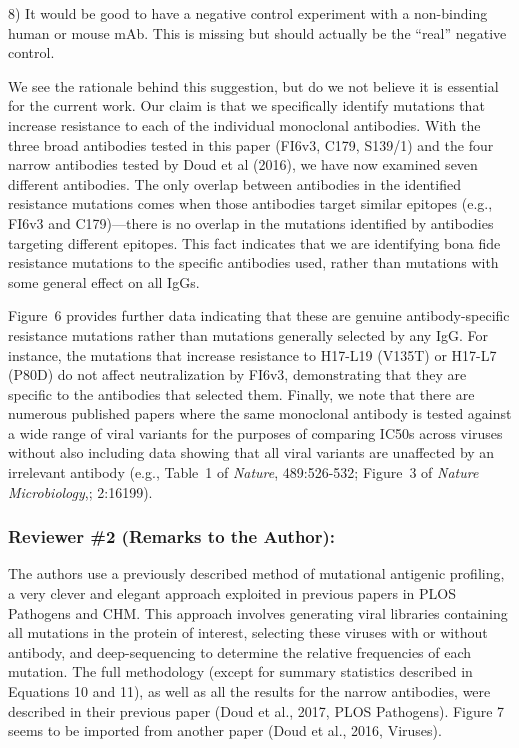 \documentclass[11pt, oneside]{article}   	%
\begin{document}
8) It would be good to have a negative control experiment with a non-binding human or mouse mAb. This is missing but should actually be the ``real'' negative control.

{\color{black}
We see the rationale behind this suggestion, but do we not believe it is essential for the current work. 
Our claim is that we specifically identify mutations that increase resistance to each of the individual monoclonal antibodies.
With the three broad antibodies tested in this paper (FI6v3, C179, S139/1) and the four narrow antibodies tested by Doud et al (2016), we have now examined seven different antibodies.
The only overlap between antibodies in the identified resistance mutations comes when those antibodies target similar epitopes (e.g., FI6v3 and C179)---there is no overlap in the mutations identified by antibodies targeting different epitopes.
This fact indicates that we are identifying bona fide resistance mutations to the specific antibodies used, rather than mutations with some general effect on all IgGs.

Figure~6 provides further data indicating that these are genuine antibody-specific resistance mutations rather than mutations generally selected by any IgG.
For instance, the mutations that increase resistance to H17-L19 (V135T) or H17-L7 (P80D) do not affect neutralization by FI6v3, demonstrating that they are specific to the antibodies that selected them.
Finally, we note that there are numerous published papers where the same monoclonal antibody is tested against a wide range of viral variants for the purposes of comparing IC50s across viruses without also including data showing that all viral variants are unaffected by an irrelevant antibody (e.g., Table~1 of \textit{Nature}, 489:526-532; Figure~3 of \textit{Nature Microbiology},; 2:16199).
}

\subsubsection*{Reviewer \#2 (Remarks to the Author):}

The authors use a previously described method of mutational antigenic profiling, a very clever and elegant approach exploited in previous papers in PLOS Pathogens and CHM. This approach involves generating viral libraries containing all mutations in the protein of interest, selecting these viruses with or without antibody, and deep-sequencing to determine the relative frequencies of each mutation. The full methodology (except for summary statistics described in Equations 10 and 11), as well as all the results for the narrow antibodies, were described in their previous paper (Doud et al., 2017, PLOS Pathogens). Figure 7 seems to be imported from another paper (Doud et al., 2016, Viruses).
\end{document}
